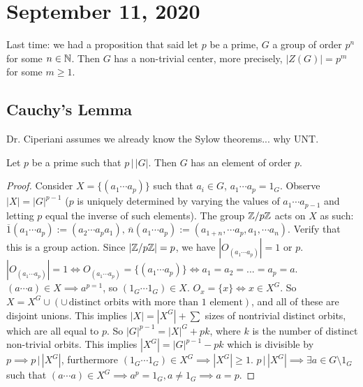 \section{September 11, 2020}
Last time: we had a proposition that said let $p$ be a prime, $G$ a group of order $p^{n}$ for some $n\in \mathbb{N}$. Then $G$ has a non-trivial center, more precisely, $|Z(G)|=p^{m}$ for some $m \geq 1$.
\subsection{Cauchy's Lemma}
Dr. Ciperiani assumes we already know the Sylow theorems... why UNT.
\begin{lemma}
   Let $p$ be a prime such that $p \,\big|\, |G|$. Then $G$ has an element of order $p$.
\end{lemma}
\begin{proof}
    Consider $X=\{(a_1\cdots a_p)\} $ such that $a_i \in G$, $a_1\cdots a_p=1_{G}$. Observe $|X|=|G|^{p-1}$ ($p$ is uniquely determined by varying the values of $a_1\cdots a_{p-1}$ and letting $p$ equal the inverse of such elements). The group $\mathbb{Z} /p\mathbb{Z}$ acts on $X$ as such: $\overline{1}(a_1\cdots a_p):=(a_2\cdots a_pa_1), \, \overline{n}(a_1\cdots a_p):=(a_{1+n},\cdots a_p, a_1, \cdots a_n)$. Verify that this is a group action. Since $|\mathbb{Z} /p\mathbb{Z}|=p$, we have $|O_{(a_1\cdots a_p)}|=1$ or $p$. $|O_{(a_1\cdots a_p)}|=1 \iff O_{(a_1\cdots a_p)}=\{(a_1\cdots a_p)\} \iff a_1=a_2=...=a_p=a$. $(a\cdots a)\in X \implies a^{p=1}$, so $(1_G \cdots 1_G)\in X$. $O_x=\{x\} \iff x\in X^{G}$. So $X=X^{G}\cup (\cup\, \text{distinct orbits with more than 1 element})$, and all of these are disjoint unions. This implies  $|X|=|X^G|+\sum$ sizes of nontrivial distinct orbits, which are all equal to $p$. So $|G|^{p-1}=|X|^{G}+pk$, where $k$ is the number of distinct non-trivial orbits. This implies $|X^{G}|=|G|^{p-1}-pk$ which is divisible by $p \implies p \,\big|\, |X^G|$, furthermore $(1_G\cdots 1_G)\in X^G\implies |X^G|\geq 1$.  $p\,\big|\, |X^G| \implies \exists a \in G\setminus 1_G$ such that $(a\cdots a)\in X^G\implies a^{p}=1_G, a\neq 1_G \implies a=p$.
\end{proof}
